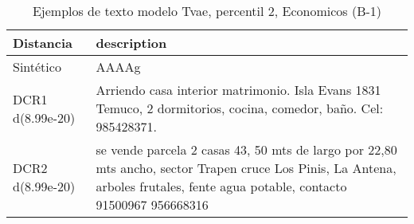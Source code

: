 \begin{table}[H]
\centering
\fontsize{10}{14}\selectfont
\caption{Ejemplos de texto modelo Tvae, percentil 2, Economicos (B-1)}
\label{table-example-economicos-b-1-tvae-2p-text}
\begin{tabular}{|l|m{35em}|}
\hline
\rowcolor[gray]{0.8}
Distancia & description \\
\hline Sintético & AAAAg \\
\hline DCR1 d(8.99e-20) & Arriendo casa interior matrimonio. Isla Evans 1831 Temuco, 2 dormitorios, cocina, comedor, ba\~no. Cel: 985428371. \\
\hline DCR2 d(8.99e-20) & se vende parcela 2 casas 43, 50 mts de largo por 22,80 mts ancho, sector Trapen cruce Los Pinis, La Antena, arboles frutales, fente agua potable, contacto 91500967 956668316 \\
\hline
\end{tabular}
\end{table}
